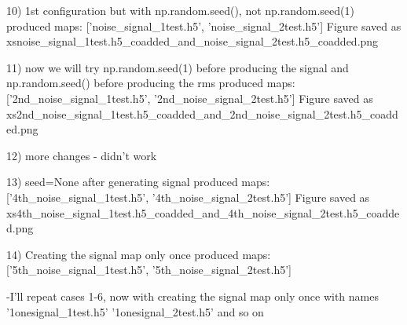 10) 1st configuration but with np.random.seed(), not np.random.seed(1)  
    produced maps:  ['noise_signal_1test.h5', 'noise_signal_2test.h5']
    Figure saved as xsnoise_signal_1test.h5_coadded_and_noise_signal_2test.h5_coadded.png

11) now we will try np.random.seed(1) before producing the signal and np.random.seed() before producing the rms
    produced maps:  ['2nd_noise_signal_1test.h5', '2nd_noise_signal_2test.h5']
    Figure saved as xs2nd_noise_signal_1test.h5_coadded_and_2nd_noise_signal_2test.h5_coadded.png

12) more changes - didn't work

13) seed=None after generating signal
    produced maps:  ['4th_noise_signal_1test.h5', '4th_noise_signal_2test.h5']
    Figure saved as xs4th_noise_signal_1test.h5_coadded_and_4th_noise_signal_2test.h5_coadded.png

14) Creating the signal map only once
    produced maps:  ['5th_noise_signal_1test.h5', '5th_noise_signal_2test.h5']

-I'll repeat cases 1-6, now with creating the signal map only once with names '1onesignal_1test.h5' '1onesignal_2test.h5' and so on
  

  




